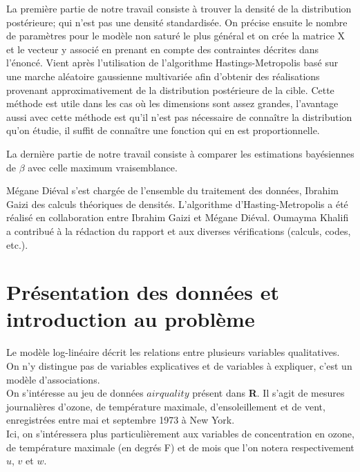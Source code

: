 \documentclass[french,12pt]{report}
\newcommand{\<}{\langle}
\renewcommand{\>}{\rangle}
\theoremstyle{definition}
\begin{document}
La première partie de notre travail consiste à trouver la densité de la distribution postérieure; qui n’est pas une densité standardisée. On précise ensuite le nombre de paramètres pour le modèle non saturé le plus général et on crée la matrice X et le vecteur y associé en prenant en compte des contraintes décrites dans l’énoncé. 
Vient après l’utilisation de l’algorithme Hastings-Metropolis basé sur une marche aléatoire gaussienne multivariée afin d’obtenir des réalisations provenant approximativement de la distribution postérieure de la cible. Cette méthode est utile dans les cas où les dimensions sont assez grandes, l’avantage aussi avec cette méthode est qu’il n’est pas nécessaire de connaître la distribution qu’on étudie, il suffit de connaître une fonction  qui en est proportionnelle.


 La dernière partie de notre travail consiste à  comparer les estimations bayésiennes de $\beta$ avec celle maximum vraisemblance.
 
\vspace{1cm}

 Mégane Diéval s'est chargée de l'ensemble du traitement des données, Ibrahim Gaizi des calculs théoriques de densités. L'algorithme d'Hasting-Metropolis a été réalisé en collaboration entre Ibrahim Gaizi et Mégane Diéval. Oumayma Khalifi a contribué à la rédaction du rapport et aux diverses vérifications (calculs, codes, etc.).

\vspace{10mm}
\pagebreak

\chapter{Présentation des données et introduction au problème}



Le modèle log-linéaire décrit les relations entre plusieurs variables qualitatives. On n'y distingue pas de variables explicatives et de variables à expliquer, c'est un modèle d'associations.\\

On s'intéresse au jeu de données $airquality$ présent dans \textbf{R}. Il s'agit de mesures journalières d'ozone, de température maximale, d'ensoleillement et de vent, enregistrées entre mai et septembre 1973 à New York. \\
Ici, on s'intéressera plus particulièrement aux variables de concentration en ozone, de température maximale (en degrés F) et de mois que l'on notera respectivement $u$, $v$ et $w$. \\ 
\end{document}
